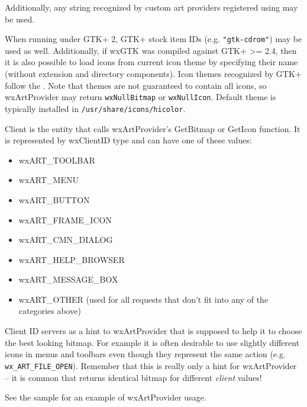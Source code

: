 Additionally, any string recognized by custom art providers registered using
 may be used.


When running under GTK+ 2, GTK+ stock item IDs (e.g. {\tt "gtk-cdrom"}) may
be used as well. Additionally, if wxGTK was compiled against GTK+ >= 2.4, then
it is also possible to load icons from current icon theme by specifying their
name (without extension and directory components). Icon themes recognized
by GTK+ follow the
. Note that themes are not guaranteed to contain all
icons, so wxArtProvider may return {\tt wxNullBitmap} or {\tt wxNullIcon}.
Default theme is typically installed in {\tt /usr/share/icons/hicolor}.

\label{artproviderclients}

Client is the entity that calls wxArtProvider's GetBitmap or GetIcon
function. It is represented by wxClientID type and can have one of these 
values:
\begin{itemize}\itemsep=0pt
\item wxART\_TOOLBAR
\item wxART\_MENU
\item wxART\_BUTTON
\item wxART\_FRAME\_ICON
\item wxART\_CMN\_DIALOG
\item wxART\_HELP\_BROWSER
\item wxART\_MESSAGE\_BOX
\item wxART\_OTHER (used for all requests that don't fit into any of the categories above)
\end{itemize}
Client ID servers as a hint to wxArtProvider that is supposed to help it to
choose the best looking bitmap. For example it is often desirable to use
slightly different icons in menus and toolbars even though they represent the
same action (e.g. {\tt wx\_ART\_FILE\_OPEN}). Remember that this is really
only a hint for wxArtProvider -- it is common that
returns identical bitmap for different {\it client} values!


See the  sample for an example of wxArtProvider usage.


